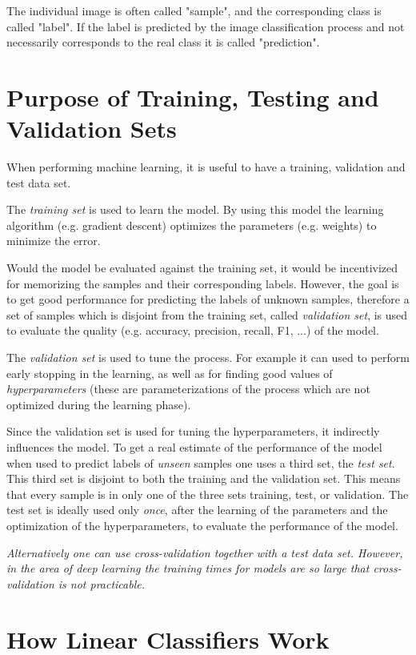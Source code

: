 \documentclass[sigconf,nonacm]{acmart}
\begin{document}
The individual image is often called "sample", and the corresponding
class is called "label".
If the label is predicted by the image classification process
and not necessarily corresponds to the real class it is
called "prediction".

\section{Purpose of Training, Testing and Validation Sets}

When performing machine learning, it is useful to have a training,
validation and test data set.

The \emph{training set} is used to learn the model. By using this model
the learning algorithm (e.g. gradient descent) optimizes the parameters
(e.g. weights) to minimize the error.

Would the model be evaluated against the training set, it would be
incentivized for memorizing the samples and their corresponding labels.
However, the goal is to get good performance for predicting
the labels of unknown samples, therefore a set of samples which is
disjoint from the training set, called \emph{validation set}, is used to
evaluate the quality (e.g. accuracy, precision, recall, F1, ...)
of the model.

The \emph{validation set} is used to tune the process. For example it can used
to perform early stopping in the learning, as well as for finding good
values of \emph{hyperparameters} (these are parameterizations of the process
which are not optimized during the learning phase).

Since the validation set is used for tuning the hyperparameters, it
indirectly influences the model.
To get a real estimate of the performance of the model when used to
predict labels of \emph{unseen} samples one uses a third set, the
\emph{test set}.
This third set is disjoint to both the training and the validation set.
This means that every sample is in only one of the three sets
training, test, or validation.
The test set is ideally used only \emph{once}, after the learning
of the parameters
and the optimization of the hyperparameters, to evaluate the performance
of the model.

\emph{Alternatively one can use cross-validation together with a test data set.
However, in the area of deep learning the training times for models are so
large that cross-validation is not practicable.}

\section{How Linear Classifiers Work}
\end{document}
